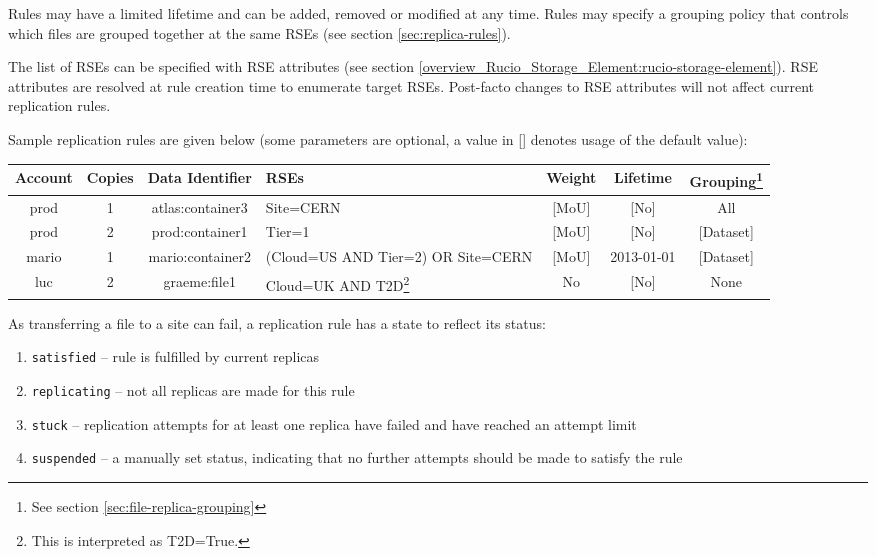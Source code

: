 \documentclass{atlasnote}
\begin{document}
Rules may have a limited lifetime and can be added, removed or modified at any time. Rules may specify a grouping policy that controls which files are grouped together at the same RSEs (see section \ref{sec:replica-rules}).

The list of RSEs can be specified with RSE attributes (see section \ref{overview_Rucio_Storage_Element:rucio-storage-element}). RSE attributes are resolved at rule creation time to enumerate target RSEs. Post-facto changes to RSE attributes will not affect current replication rules.

Sample replication rules are given below (some parameters are optional, a value in [] denotes usage of the default value):

\begin{minipage}{12cm}
\begin{tabular}{c c c p{2cm} c c c}
\toprule
\textbf{Account} & \textbf{Copies} & \textbf{Data Identifier} & \textbf{RSEs} & \textbf{Weight} & \textbf{Lifetime} & \textbf{Grouping\footnote{See section \ref{sec:file-replica-grouping} }} \\
\midrule
prod & 1 & atlas:container3 & Site=CERN & [MoU] & [No] & All \\
prod & 2 & prod:container1 & Tier=1 & [MoU] & [No] & [Dataset] \\
mario & 1 & mario:container2 & (Cloud=US AND Tier=2) OR Site=CERN & [MoU] & 2013-01-01 & [Dataset] \\
luc & 2 & graeme:file1 & Cloud=UK AND T2D\footnote{This is interpreted as T2D=True.} & No & [No] & None \\
\bottomrule
\end{tabular}
\end{minipage}

As transferring a file to a site can fail, a replication rule has a state to reflect its status:

\begin{enumerate}
\item[] \texttt{satisfied} -- rule is fulfilled by current replicas
\item[] \texttt{replicating} -- not all replicas are made for this rule
\item[] \texttt{stuck} -- replication attempts for at least one replica have failed and have reached an attempt limit
\item[] \texttt{suspended} -- a manually set status, indicating that no further attempts should be made to satisfy the rule
\end{enumerate}
\end{document}
